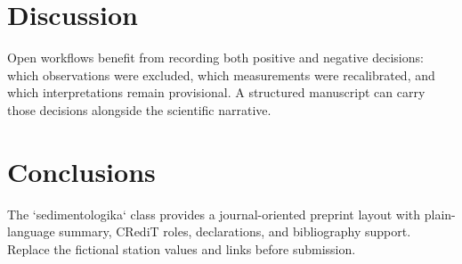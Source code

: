 \documentclass[preprint]{sedimentologika}
\begin{document}
\section{Discussion}
Open workflows benefit from recording both positive and negative decisions:
which observations were excluded, which measurements were recalibrated, and
which interpretations remain provisional.  A structured manuscript can carry
those decisions alongside the scientific narrative.

\section{Conclusions}
The `sedimentologika` class provides a journal-oriented preprint layout with
plain-language summary, CRediT roles, declarations, and bibliography support.
Replace the fictional station values and links before submission.

\printbibliography
\end{document}
